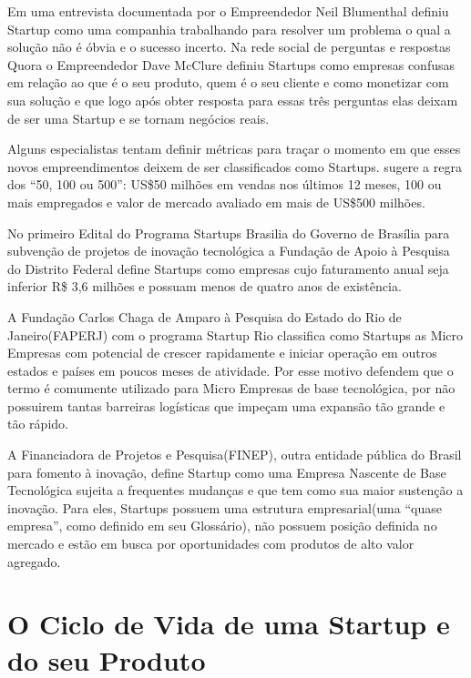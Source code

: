 Em uma entrevista documentada por  o Empreendedor Neil Blumenthal definiu Startup como uma companhia trabalhando para resolver um problema o qual a solução não é óbvia e o sucesso incerto. Na rede social de perguntas e respostas Quora o Empreendedor Dave McClure definiu Startups como empresas confusas em relação ao que é o seu produto, quem é o seu cliente e como monetizar com sua solução e que logo após obter resposta para essas três perguntas elas deixam de ser uma Startup e se tornam negócios reais.

Alguns especialistas tentam definir métricas para traçar o momento em que esses novos empreendimentos deixem de ser classificados como Startups.  sugere a regra dos ``50, 100 ou 500'': US\$50 milhões em vendas nos últimos 12 meses, 100 ou mais empregados e valor de mercado avaliado em mais de US\$500 milhões.   

No primeiro Edital do Programa Startups Brasilia do Governo de Brasília para subvenção de projetos de inovação tecnológica a Fundação de Apoio à Pesquisa do Distrito Federal define Startups como empresas cujo faturamento anual seja inferior R\$ 3,6 milhões e possuam menos de quatro anos de existência. 

A Fundação Carlos Chaga de Amparo à Pesquisa do Estado do Rio de Janeiro(FAPERJ) com o programa Startup Rio classifica como Startups as Micro Empresas com potencial de crescer rapidamente e iniciar operação em outros estados e países em poucos meses de atividade. Por esse motivo defendem que o termo é comumente utilizado para Micro Empresas de base tecnológica, por não possuirem tantas barreiras logísticas que impeçam uma expansão tão grande e tão rápido.

A Financiadora de Projetos e Pesquisa(FINEP), outra entidade pública do Brasil para fomento à inovação, define Startup como uma Empresa Nascente de Base Tecnológica sujeita a frequentes mudanças e que tem como sua maior sustenção a inovação. Para eles, Startups possuem uma estrutura empresarial(uma ``quase empresa'', como definido em seu Glossário), não possuem posição definida no mercado e estão em busca por oportunidades com produtos de alto valor agregado.

\section{O Ciclo de Vida de uma Startup e do seu Produto}
\label{section:o_ciclo_de_vida}

